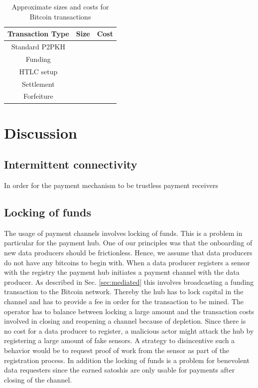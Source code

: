 \documentclass[10pt,journal,compsoc]{IEEEtran}
\newcommand\tabhead[1]{\small\textbf{#1}}
\begin{document}
\begin{table}
  \centering
  \caption{Approximate sizes and costs for Bitcoin transactions}
  \begin{tabular}{|c|l|l|}
    \hline
    \tabhead{Transaction Type} &
    \tabhead{Size} &
    \tabhead{Cost} \\
    \hline
    Standard P2PKH & \multicolumn{1}{|p{0.5\columnwidth}|}{} & \\
    \hline
    Funding & \multicolumn{1}{|p{0.5\columnwidth}|}{} & \\
    \hline
    HTLC setup & \multicolumn{1}{|p{0.5\columnwidth}|}{} & \\
    \hline
    Settlement & \multicolumn{1}{|p{0.5\columnwidth}|}{} & \\
    \hline
    Forfeiture & \multicolumn{1}{|p{0.5\columnwidth}|}{} & \\
    \hline
  \end{tabular}
  \label{tbl:fees}
\end{table}


\section{Discussion}

\subsection{Intermittent connectivity}
In order for the payment mechanism to be trustless payment receivers 


\subsection{Locking of funds}

The usage of payment channels involves locking of funds. This is a problem in particular for the payment hub. One of our principles was that the onboarding of new data producers should be frictionless. Hence, we assume that data producers do not have any bitcoins to begin with. When a data producer registers a sensor with the registry the payment hub initiates a payment channel with the data producer. As described in Sec. \ref{sec:mediated} this involves broadcasting a funding transaction to the Bitcoin network. Thereby the hub has to lock capital in the channel and has to provide a fee in order for the transaction to be mined. The operator has to balance between locking a large amount and the transaction costs involved in closing and reopening a channel because of depletion.
Since there is no cost for a data producer to register, a malicious actor might attack the hub by registering a large amount of fake sensors. A strategy to disincentive such a behavior would be to request proof of work from the sensor as part of the registration process. 
In addition the locking of funds is a problem for benevolent data requesters since the earned satoshis are only usable for payments after closing of the channel. 
\end{document}
